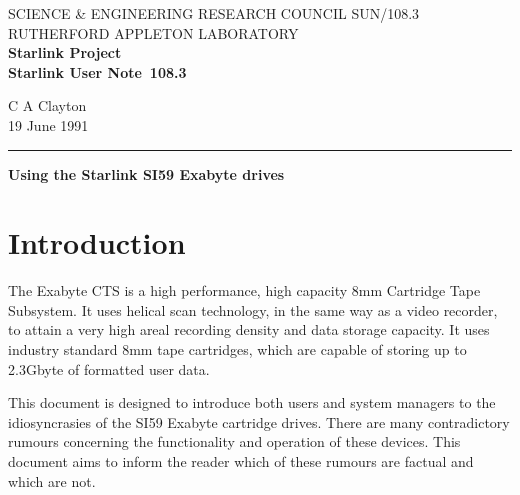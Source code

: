 \pagestyle{myheadings}

\newcommand{\stardoccategory}  {Starlink User Note}
\newcommand{\stardocinitials}  {SUN}
\newcommand{\stardocnumber}    {108.3}
\newcommand{\stardocauthors}   {C A Clayton}
\newcommand{\stardocdate}      {19 June 1991}
\newcommand{\stardoctitle}     {Using the Starlink SI59 Exabyte drives}

\newcommand{\stardocname}{\stardocinitials /\stardocnumber}
\markright{\stardocname}
\setlength{\textwidth}{160mm}
\setlength{\textheight}{240mm}
\setlength{\topmargin}{-5mm}
\setlength{\oddsidemargin}{0mm}
\setlength{\evensidemargin}{0mm}
\setlength{\parindent}{0mm}
\setlength{\parskip}{\medskipamount}
\setlength{\unitlength}{1mm}


\thispagestyle{empty}
SCIENCE \& ENGINEERING RESEARCH COUNCIL \hfill \stardocname\\
RUTHERFORD APPLETON LABORATORY\\
{\large\bf Starlink Project\\}
{\large\bf \stardoccategory\ \stardocnumber}
\begin{flushright}
\stardocauthors\\
\stardocdate
\end{flushright}
\vspace{-4mm}
\rule{\textwidth}{0.5mm}
\vspace{5mm}
\begin{center}
{\Large\bf \stardoctitle}
\end{center}
\vspace{5mm}

\section{Introduction}

The Exabyte CTS is a high performance, high capacity 8mm Cartridge Tape 
Subsystem. It uses helical scan technology, in the same way as a video
recorder,
to attain a very high areal recording density and data storage capacity.
It uses industry standard 8mm tape cartridges, which are capable of storing 
up to 2.3Gbyte of formatted user data.

This document is designed to introduce both users and system managers
to the idiosyncrasies of the SI59 Exabyte cartridge drives. There are
many contradictory rumours concerning the functionality and operation
of these devices. This document aims to inform the reader which of these
rumours are factual and which are not.

